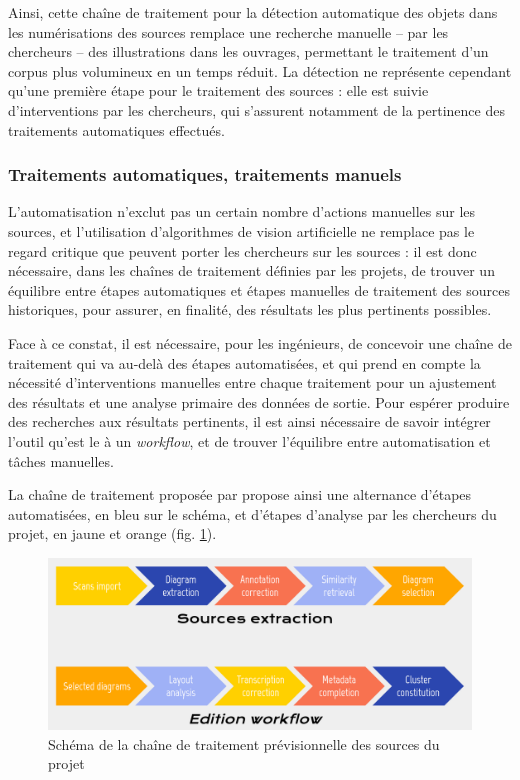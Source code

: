 	Ainsi, cette chaîne de traitement pour la détection automatique des objets dans les numérisations des sources remplace une recherche manuelle -- par les chercheurs -- des illustrations dans les ouvrages, permettant le traitement d'un corpus plus volumineux en un temps réduit. La détection ne représente cependant qu'une première étape pour le traitement des sources : elle est suivie d'interventions par les chercheurs, qui s'assurent notamment de la pertinence des traitements automatiques effectués.

    \subsubsection{Traitements automatiques, traitements manuels}
   	L'automatisation n'exclut pas un certain nombre d'actions manuelles sur les sources, et l'utilisation d'algorithmes de vision artificielle ne remplace pas le regard critique que peuvent porter les chercheurs sur les sources : il est donc nécessaire, dans les chaînes de traitement définies par les projets, de trouver un équilibre entre étapes automatiques et étapes manuelles de traitement des sources historiques, pour assurer, en finalité, des résultats les plus pertinents possibles.
   	
    Face à ce constat, il est nécessaire, pour les ingénieurs, de concevoir une chaîne de traitement qui va au-delà des étapes automatisées, et qui prend en compte la nécessité d'interventions manuelles entre chaque traitement pour un ajustement des résultats et une analyse primaire des données de sortie. Pour espérer produire des recherches aux résultats pertinents, il est ainsi nécessaire de savoir intégrer l'outil qu'est le \dl à un \textit{workflow}, et de trouver l'équilibre entre automatisation et tâches manuelles.
	
	La chaîne de traitement proposée par \eida propose ainsi une alternance d'étapes automatisées, en bleu sur le schéma, et d'étapes d'analyse par les chercheurs du projet, en jaune et orange (fig. \ref{fig:eida_workflow}).
    
    \begin{figure}[h]
    	\centering
    	\includegraphics[width=16cm]{images/eida_workflow.png}
    	\caption{Schéma de la chaîne de traitement prévisionnelle des sources du projet \eida}
    	\label{fig:eida_workflow}
    \end{figure}

